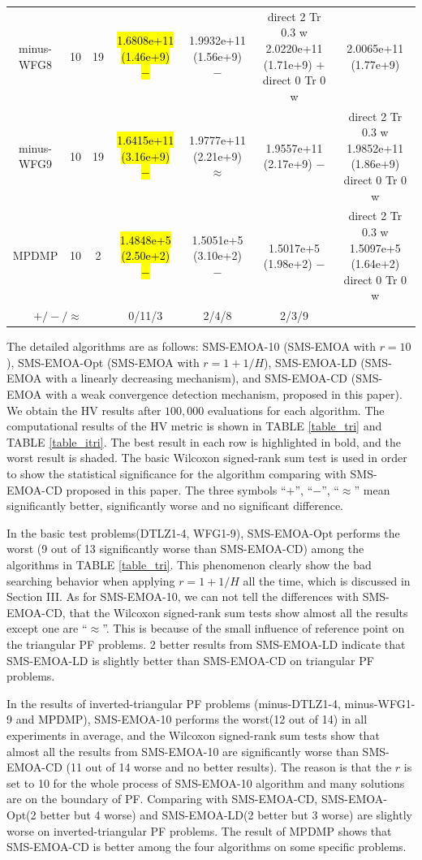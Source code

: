 \documentclass[conference]{IEEEtran}
\newcommand{\semitextbf}[1]{%
	\pdfliteral direct {2 Tr 0.3 w} %
	#1%
	\pdfliteral direct {0 Tr 0 w}%
}
\begin{document}
\begin{table}[!t]
\begin{tabular}{ccccccc}
      \multirow{1}{*}{minus-WFG8}&10&19&\hl{1.6808e+11 (1.46e+9) $-$}&1.9932e+11 (1.56e+9) $-$&\semitextbf{2.0220e+11 (1.71e+9) $+$}&2.0065e+11 (1.77e+9)\\
      \multirow{1}{*}{minus-WFG9}&10&19&\hl{1.6415e+11 (3.16e+9) $-$}&1.9777e+11 (2.21e+9) $\approx$&1.9557e+11 (2.17e+9) $-$&\semitextbf{1.9852e+11 (1.86e+9)}\\
      \hline
      \multirow{1}{*}{MPDMP}&10&2&\hl{1.4848e+5 (2.50e+2) $-$}&1.5051e+5 (3.10e+2) $-$&1.5017e+5 (1.98e+2) $-$&\semitextbf{1.5097e+5 (1.64e+2)}\\
      \midrule
      \multicolumn{3}{c}{$+/-/\approx$}&0/11/3&2/4/8&2/3/9&\\
      \bottomrule
    \end{tabular}
  \end{table}

The detailed algorithms are as follows: 
SMS-EMOA-10 (SMS-EMOA\cite{smsemoa} with $r=10$),
SMS-EMOA-Opt (SMS-EMOA with $r=1+1/H$),
SMS-EMOA-LD (SMS-EMOA with a linearly decreasing mechanism),
and SMS-EMOA-CD (SMS-EMOA with a weak convergence detection mechanism, proposed in this paper).
We obtain the HV results after $100,000$ evaluations for each algorithm. 
The computational results of the HV metric is shown in TABLE \ref{table_tri} and TABLE \ref{table_itri}. 
The best result in each row is highlighted in bold, and the worst result is shaded. 
The basic Wilcoxon signed-rank sum test is used in order to show the statistical significance for the algorithm
comparing with SMS-EMOA-CD proposed in this paper. The three symbols ``$+$'', ``$-$'', ``$\approx$'' 
mean significantly better, significantly worse and no significant difference.

In the basic test problems(DTLZ1-4, WFG1-9), 
SMS-EMOA-Opt performs the worst (9 out of 13 significantly worse than SMS-EMOA-CD) among the algorithms in TABLE \ref{table_tri}. 
This phenomenon clearly show the bad searching behavior when applying $r=1+1/H$ all the time, 
which is discussed in Section III. 
As for SMS-EMOA-10, we can not tell the differences with SMS-EMOA-CD, 
that the Wilcoxon signed-rank sum tests show almost all the results except one are ``$\approx$''. 
This is because of the small influence of reference point on the triangular PF problems. 
2 better results from SMS-EMOA-LD indicate that SMS-EMOA-LD is slightly better than SMS-EMOA-CD on triangular PF problems. 

In the results of inverted-triangular PF problems (minus-DTLZ1-4, minus-WFG1-9 and MPDMP), 
SMS-EMOA-10 performs the worst(12 out of 14) in all experiments in average, 
and the Wilcoxon signed-rank sum tests show that almost all the results from SMS-EMOA-10 are significantly worse than SMS-EMOA-CD
(11 out of 14 worse and no better results). 
The reason is that the $r$ is set to 10 for the whole process of SMS-EMOA-10 algorithm and many solutions are on the boundary of PF.
Comparing with SMS-EMOA-CD, SMS-EMOA-Opt(2 better but 4 worse) and SMS-EMOA-LD(2 better but 3 worse) are slightly worse 
on inverted-triangular PF problems. 
The result of MPDMP shows that SMS-EMOA-CD is better among the four algorithms on some specific problems. 
\end{document}

